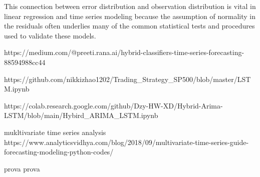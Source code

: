 This connection between error distribution and observation distribution is vital in linear regression and time series modeling because the assumption of normality in the residuals often underlies many of the common statistical tests and procedures used to validate these models.



https://medium.com/@preeti.rana.ai/hybrid-classifiers-time-series-forecasting-88594988cc44


https://github.com/nikkizhao1202/Trading_Strategy_SP500/blob/master/LSTM.ipynb


https://colab.research.google.com/github/Dzy-HW-XD/Hybrid-Arima-LSTM/blob/main/Hybird_ARIMA_LSTM.ipynb

mukltivariate time series analysis 
https://www.analyticsvidhya.com/blog/2018/09/multivariate-time-series-guide-forecasting-modeling-python-codes/


prova
prova